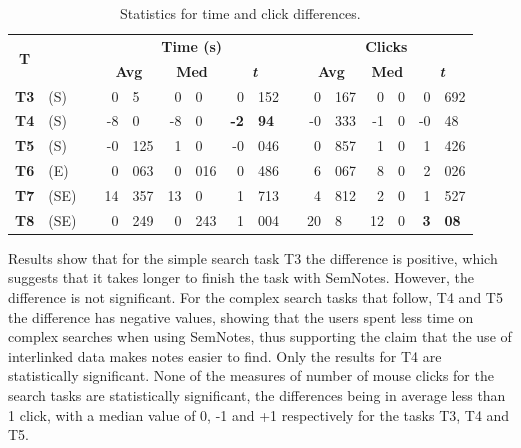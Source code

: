 \begin{table}[htp]
\centering
{}
\begin{tabular}{@{}clcr@{.}lr@{.}lr@{.}lcr@{.}lr@{.}lr@{.}l}
\toprule
\multirow{2}{*}{\textbf{T}} &&& \multicolumn{6}{c}{\textbf{Time (s)}} && \multicolumn{6}{c}{\textbf{Clicks}} \\

&&& \multicolumn{2}{c}{\textbf{Avg}} & \multicolumn{2}{c}{\textbf{Med}} & \multicolumn{2}{c}{\textbf{\textit{t}}} && \multicolumn{2}{c}{\textbf{Avg}} & \multicolumn{2}{c}{\textbf{Med}} & \multicolumn{2}{c}{\textbf{\textit{t}}} \\
\midrule
\textbf{T3} & (S) && 0 & 5 & 0 & 0 & 0 & 152 && 0 & 167 & 0 & 0 & 0 & 692 \\

\textbf{T4} & (S) && -8 & 0 & -8 & 0 & \textbf{-2} & \textbf{94} && -0 & 333 & -1 & 0 & -0 & 48 \\

\textbf{T5} & (S) && -0 & 125 & 1 & 0 & -0 & 046 && 0 & 857 & 1 & 0 & 1 & 426 \\

\textbf{T6} & (E) && 0 & 063 & 0 & 016 & 0 & 486 && 6 & 067 & 8 & 0 & 2 & 026 \\

\textbf{T7} & (SE) && 14 & 357 & 13 & 0 & 1 & 713 && 4 & 812 & 2 & 0 & 1 & 527 \\

\textbf{T8} & (SE) && 0 & 249 & 0 & 243 & 1 & 004 && 20 & 8 & 12 & 0 & \textbf{3} & \textbf{08} \\

\bottomrule
\end{tabular} 
\caption{Statistics for time and click differences.}
\label{tab:semnotesresults}
\end{table}

Results show that for the simple search task T3 the difference is positive, which suggests that it takes longer to finish the task with SemNotes. However, the difference is not significant. For the complex search tasks that follow, T4 and T5 the difference has negative values, showing that the users spent less time on complex searches when using SemNotes, thus supporting the claim that the use of interlinked data makes notes easier to find. Only the results for T4 are statistically significant. None of the measures of number of mouse clicks for the search tasks are statistically significant, the differences being in average less than 1 click, with a median value of 0, -1 and +1 respectively for the tasks T3, T4 and T5.

